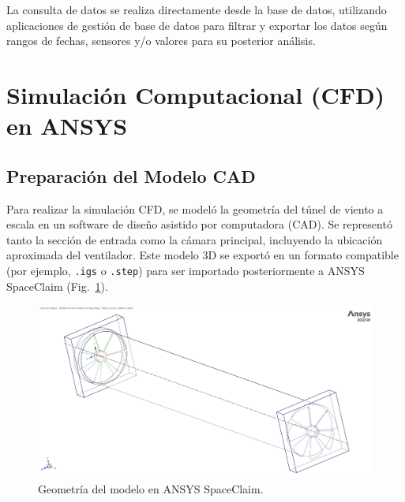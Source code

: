 La consulta de datos se realiza directamente desde la base de datos, utilizando aplicaciones de gestión de base de datos para filtrar y exportar los datos según rangos de fechas, sensores y/o valores para su posterior análisis.

\newpage
\section{Simulación Computacional (CFD) en ANSYS}
\subsection{Preparación del Modelo CAD}
Para realizar la simulación CFD, se modeló la geometría del túnel de viento a escala en un software de diseño asistido por computadora (CAD). Se representó tanto la sección de entrada como la cámara principal, incluyendo la ubicación aproximada del ventilador. Este modelo 3D se exportó en un formato compatible (por ejemplo, \texttt{.igs} o \texttt{.step}) para ser importado posteriormente a ANSYS SpaceClaim (Fig.~\ref{fig:space}).

\begin{figure}[!ht]
    \centering
    \includegraphics[width=0.8\linewidth]{images/space.png}
    \caption{Geometría del modelo en ANSYS SpaceClaim.}
    \label{fig:space}
\end{figure}

\newpage

